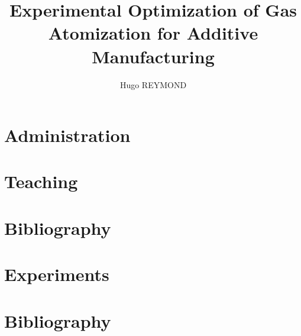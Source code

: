 \documentclass[12pt,twoside,openright]{book}
\begin{document}
\frontmatter
\title{Experimental Optimization of Gas Atomization for Additive Manufacturing}
\author{Hugo REYMOND}
\date{}
\maketitle

\tableofcontents
\listoffigures
\listoftables

\mainmatter

\chapter*{Administration}
\markboth{}{ }



\chapter*{Teaching}
\markboth{}{ }



\chapter*{Bibliography}
\markboth{}{ }



\chapter*{Experiments}
\markboth{}{ }



\backmatter
\appendix
% 
% 

\chapter*{Bibliography}
\markboth{}{ }

% 
% 

% 
\printbibliography
\end{document}

